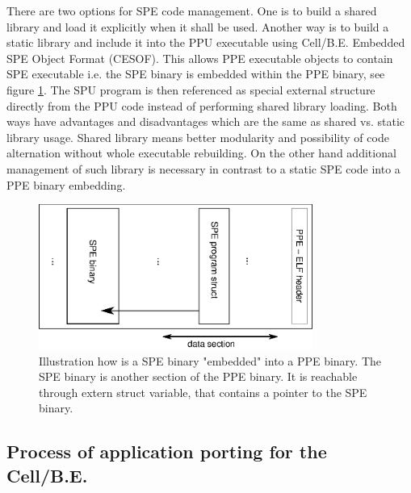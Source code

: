 \par
There are two options for SPE code management.
One is to build a shared library and load it explicitly when it shall be used.
Another way is to build a static library and include it into the PPU executable using \mbox{Cell/B.E.} Embedded SPE Object Format (CESOF).
This allows PPE executable objects to contain SPE executable i.e. the SPE binary is embedded within the PPE binary, see figure \ref{fg:SPEEmbedding}.
The SPU program is then referenced as special external structure directly from the PPU code instead of performing shared library loading.
Both ways have advantages and disadvantages which are the same as shared vs. static library usage.
Shared library means better modularity and possibility of code alternation without whole executable rebuilding.
On the other hand additional management of such library is necessary in contrast to a static SPE code into a PPE binary embedding.


\begin{figure}
    \centering
    \includegraphics[width=0.8\textwidth]{data/SPEEmbedding}
    \caption[SPE binary embedding]{Illustration how is a SPE binary "embedded" into a PPE binary.
The SPE binary is another section of the PPE binary.
It is reachable through extern struct variable, that contains a pointer to the SPE binary.}
    \label{fg:SPEEmbedding}
\end{figure}



\subsection {Process of application porting for the \mbox{Cell/B.E.}}
\label{sect:portingProcess}

